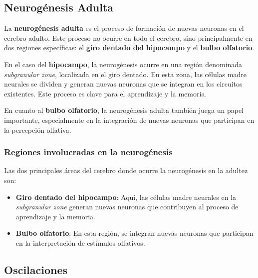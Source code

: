 \documentclass[12pt, letterpaper]{article}
\begin{document}
\subsection{Neurogénesis Adulta}
La \textbf{neurogénesis adulta} es el proceso de formación de nuevas neuronas en el cerebro adulto. Este proceso no ocurre en todo el cerebro, sino principalmente en dos regiones específicas: el \textbf{giro dentado del hipocampo} y el \textbf{bulbo olfatorio}.

En el caso del \textbf{hipocampo}, la neurogénesis ocurre en una región denominada \textit{subgranular zone}, localizada en el giro dentado. En esta zona, las células madre neurales se dividen y generan nuevas neuronas que se integran en los circuitos existentes. Este proceso es clave para el aprendizaje y la memoria.

En cuanto al \textbf{bulbo olfatorio}, la neurogénesis adulta también juega un papel importante, especialmente en la integración de nuevas neuronas que participan en la percepción olfativa.

\subsubsection{Regiones involucradas en la neurogénesis}
Las dos principales áreas del cerebro donde ocurre la neurogénesis en la adultez son:

\begin{itemize}
    \item \textbf{Giro dentado del hipocampo}: Aquí, las células madre neurales en la \textit{subgranular zone} generan nuevas neuronas que contribuyen al proceso de aprendizaje y la memoria.
    \item \textbf{Bulbo olfatorio}: En esta región, se integran nuevas neuronas que participan en la interpretación de estímulos olfativos.
\end{itemize}


\subsection{Oscilaciones}
\end{document}
